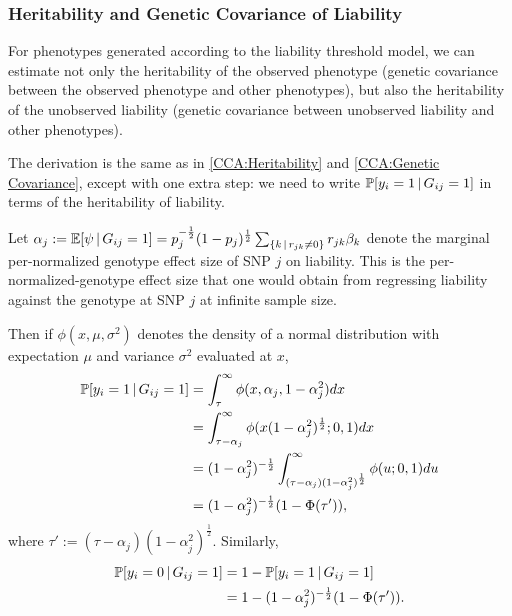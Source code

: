 \documentclass[11pt]{article}
\numberwithin{equation}{section}
\numberwithin{definition}{section}
\numberwithin{thm}{section}
\numberwithin{lemma}{section}
\numberwithin{prop}{section}
\numberwithin{cor}{section}
\numberwithin{hyp}{section}
\begin{document}
\subsubsection{Heritability and Genetic Covariance of Liability}\label{CCA:Liability Threshold Model}

For phenotypes generated according to the liability threshold model, we can estimate not only the heritability of the observed
phenotype (genetic covariance between the observed phenotype and other phenotypes), but also the heritability of the 
unobserved liability (genetic covariance between unobserved liability and other phenotypes).

The derivation is the same as in \ref{CCA:Heritability} and \ref{CCA:Genetic Covariance}, except with one extra step: 
we need to write $\mathbb{P}[y_i=1\,|\, G_{ij}=1]$ in terms of the heritability of liability.

Let $\alpha_j:=\mathbb{E}[\psi\,|\, G_{ij}=1] = p_j^{-\frac{1}{2}}(1-p_j)^{\frac{1}{2}}\sum_{\{k\,|\, r_{jk} \neq 0\}} r_{jk}\beta_k$ 
denote the marginal per-normalized genotype effect size of SNP $j$ on liability.
This is the per-normalized-genotype effect size that one would obtain from regressing liability against the genotype at SNP $j$
at infinite sample size.

Then if $\phi(x,\mu,\sigma^2)$ denotes the density of a normal distribution
with expectation $\mu$ and variance $\sigma^2$ evaluated at $x$,
\begin{align*}
	\prob[y_i=1\cond G_{ij}=1] 
&= 
	\int_{\tau}^\infty \phi(x,\alpha_j,1-\alpha_j^2)dx\\
&=
	\int_{\tau-\alpha_j}^\infty \phi(x(1-\alpha_j^2)^{\frac{1}{2}};0,1)dx\\
&= %
	(1-\alpha_j^2)^{-\frac{1}{2}}\int_{(\tau-\alpha_j)(1-\alpha_j^2)^{\frac{1}{2}}}^\infty \phi(u;0,1)du\\
&= 
	(1-\alpha_j^2)^{-\frac{1}{2}}(1 - \Phi(\tau')),
\end{align*}
where $\tau' := (\tau-\alpha_j)(1-\alpha_j^2)^{\frac{1}{2}}$. 
Similarly,
\begin{align*}
	\mathbb{P}[y_i=0\,|\, G_{ij}=1] 
&= 
	1-\mathbb{P}[y_i=1\,|\, G_{ij}=1] \\
&=	
	1 - (1-\alpha_j^2)^{-\frac{1}{2}}(1 - \Phi(\tau')).
\end{align*}
\end{document}
